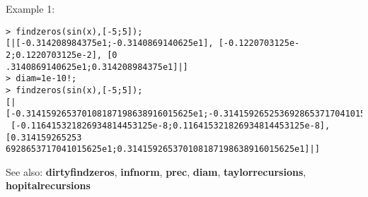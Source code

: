 \noindent Example 1: 
\begin{center}\begin{minipage}{15cm}\begin{Verbatim}[frame=single]
> findzeros(sin(x),[-5;5]);
[|[-0.314208984375e1;-0.3140869140625e1], [-0.1220703125e-2;0.1220703125e-2], [0
.3140869140625e1;0.314208984375e1]|]
> diam=1e-10!;
> findzeros(sin(x),[-5;5]);
[|[-0.314159265370108187198638916015625e1;-0.3141592652536928653717041015625e1],
 [-0.116415321826934814453125e-8;0.116415321826934814453125e-8], [0.314159265253
6928653717041015625e1;0.314159265370108187198638916015625e1]|]
\end{Verbatim}
\end{minipage}\end{center}
See also: \textbf{dirtyfindzeros}, \textbf{infnorm}, \textbf{prec}, \textbf{diam}, \textbf{taylorrecursions}, \textbf{hopitalrecursions}
